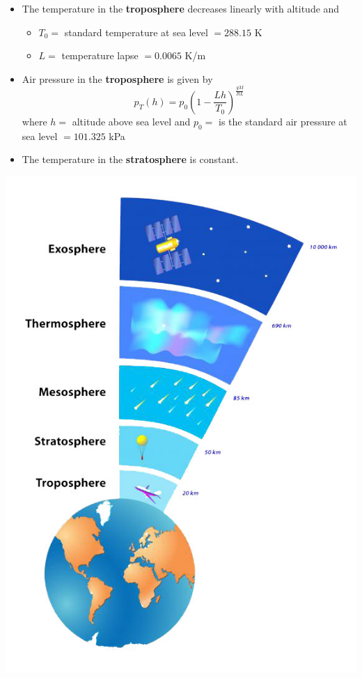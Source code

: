\begin{enumerate}
\begin{enumerate}
\begin{minipage}{.7\textwidth}
\begin{itemize}
		\item The temperature in the \textbf{troposphere} decreases linearly with altitude and
		\begin{itemize}
			\item $T_0=$ standard temperature at sea level $=288.15$ K
			\item $L=$ temperature lapse $ = 0.0065$ K/m
		\end{itemize}
		\item Air pressure in the \textbf{troposphere} is given by
			\[ p_T(h) = 	p_0 \left( 1 - \frac{Lh}{T_0} \right)^{\frac{gM}{RL}}\]
			where $h=$ altitude above sea level and $p_0=$ is the standard air pressure at sea level $= 101.325$ kPa \\
	
		\item The temperature in the \textbf{stratosphere} is constant.
	\end{itemize}
	\end{minipage}
	\hfill
	\begin{minipage}{.3\textwidth}
		\includegraphics[width=\textwidth]{atmosphere.jpg}
	\end{minipage}


\end{enumerate}
\end{enumerate}
